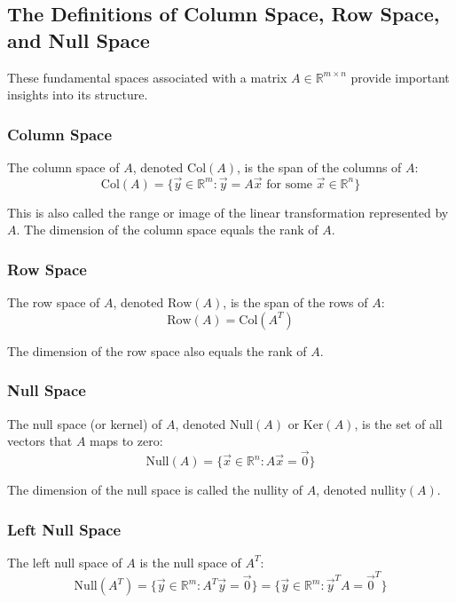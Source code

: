 \subsection{The Definitions of Column Space, Row Space, and Null Space}

These fundamental spaces associated with a matrix \(A \in \mathbb{R}^{m \times n}\) provide important insights into its structure.

\subsubsection{Column Space}
The column space of \(A\), denoted \(\text{Col}(A)\), is the span of the columns of \(A\):
\begin{equation*}
\text{Col}(A) = \{\vec{y} \in \mathbb{R}^m : \vec{y} = A\vec{x} \text{ for some } \vec{x} \in \mathbb{R}^n\}
\end{equation*}

This is also called the range or image of the linear transformation represented by \(A\). The dimension of the column space equals the rank of \(A\).

\subsubsection{Row Space}
The row space of \(A\), denoted \(\text{Row}(A)\), is the span of the rows of \(A\):
\begin{equation*}
\text{Row}(A) = \text{Col}(A^T)
\end{equation*}

The dimension of the row space also equals the rank of \(A\).

\subsubsection{Null Space}
The null space (or kernel) of \(A\), denoted \(\text{Null}(A)\) or \(\text{Ker}(A)\), is the set of all vectors that \(A\) maps to zero:
\begin{equation*}
\text{Null}(A) = \{\vec{x} \in \mathbb{R}^n : A\vec{x} = \vec{0}\}
\end{equation*}

The dimension of the null space is called the nullity of \(A\), denoted \(\text{nullity}(A)\).

\subsubsection{Left Null Space}
The left null space of \(A\) is the null space of \(A^T\):
\begin{equation*}
\text{Null}(A^T) = \{\vec{y} \in \mathbb{R}^m : A^T\vec{y} = \vec{0}\} = \{\vec{y} \in \mathbb{R}^m : \vec{y}^T A = \vec{0}^T\}
\end{equation*}

